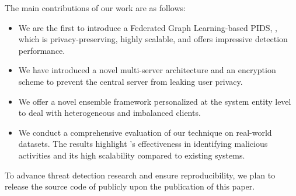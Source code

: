 The main contributions of our work are as follows:

\begin{itemize}[topsep=.1ex,itemsep=-.1ex,leftmargin=*]
    \item We are the first to introduce a Federated Graph Learning-based PIDS, \Sys, which is privacy-preserving, highly scalable, and offers impressive detection performance.
    \item We have introduced a novel multi-server architecture and an encryption scheme to prevent the central server from leaking user privacy.
    \item We offer a novel \gnnshort ensemble framework personalized at the system entity level to deal with heterogeneous and imbalanced clients.
    \item We conduct a comprehensive evaluation of our technique on real-world datasets. The results highlight \Sys's effectiveness in identifying malicious activities and its high scalability compared to existing systems.
\end{itemize}

 To advance threat detection research and ensure reproducibility, we plan to release the source code of \Sys publicly upon the publication of this paper.